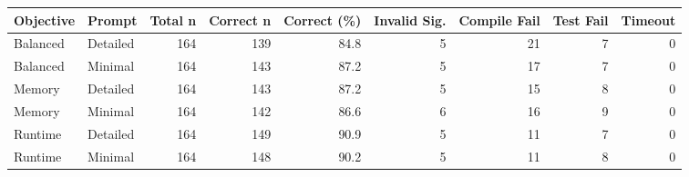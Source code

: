 \begin{tabular}{llrrrrrrr}
\toprule
Objective & Prompt & Total n & Correct n & Correct (\%) & Invalid Sig. & Compile Fail & Test Fail & Timeout \\
\midrule
Balanced & Detailed & 164 & 139 & 84.8 & 5 & 21 & 7 & 0 \\
Balanced & Minimal & 164 & 143 & 87.2 & 5 & 17 & 7 & 0 \\
Memory & Detailed & 164 & 143 & 87.2 & 5 & 15 & 8 & 0 \\
Memory & Minimal & 164 & 142 & 86.6 & 6 & 16 & 9 & 0 \\
Runtime & Detailed & 164 & 149 & 90.9 & 5 & 11 & 7 & 0 \\
Runtime & Minimal & 164 & 148 & 90.2 & 5 & 11 & 8 & 0 \\
\bottomrule
\end{tabular}
